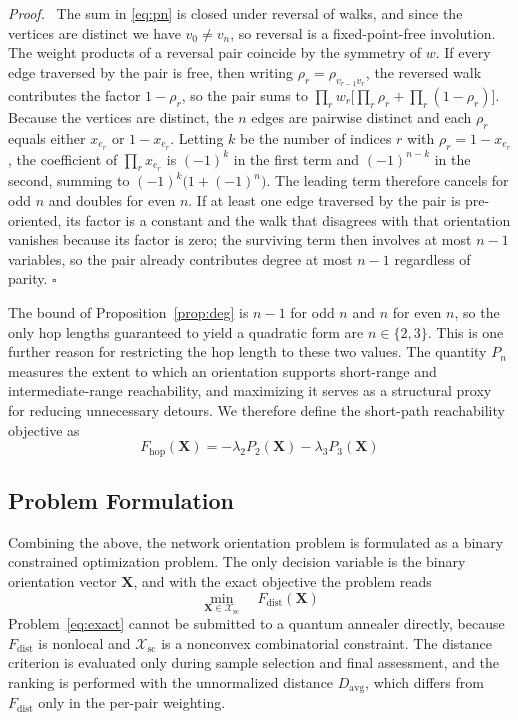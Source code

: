 \documentclass[twocolumn,a4paper]{article}
\newenvironment{proof}{\par\noindent\textit{Proof.}\ }{\hfill\(\square\)\par\medskip}
\begin{document}
\begin{proof}
The sum in \eqref{eq:pn} is closed under reversal of walks, and since the vertices are distinct we have \(v_0\neq v_n\), so reversal is a fixed-point-free involution. The weight products of a reversal pair coincide by the symmetry of \(w\). If every edge traversed by the pair is free, then writing \(\rho_r=\rho_{v_{r-1}v_r}\), the reversed walk contributes the factor \(1-\rho_r\), so the pair sums to \(\prod_rw_r\bigl[\prod_r\rho_r+\prod_r(1-\rho_r)\bigr]\). Because the vertices are distinct, the \(n\) edges are pairwise distinct and each \(\rho_r\) equals either \(x_{e_r}\) or \(1-x_{e_r}\). Letting \(k\) be the number of indices \(r\) with \(\rho_r=1-x_{e_r}\), the coefficient of \(\prod_rx_{e_r}\) is \((-1)^k\) in the first term and \((-1)^{n-k}\) in the second, summing to \((-1)^k\bigl(1+(-1)^n\bigr)\). The leading term therefore cancels for odd \(n\) and doubles for even \(n\). If at least one edge traversed by the pair is pre-oriented, its factor is a constant and the walk that disagrees with that orientation vanishes because its factor is zero; the surviving term then involves at most \(n-1\) variables, so the pair already contributes degree at most \(n-1\) regardless of parity.
\end{proof}

The bound of Proposition~\ref{prop:deg} is \(n-1\) for odd \(n\) and \(n\) for even \(n\), so the only hop lengths guaranteed to yield a quadratic form are \(n\in\{2,3\}\). This is one further reason for restricting the hop length to these two values. The quantity \(P_n\) measures the extent to which an orientation supports short-range and intermediate-range reachability, and maximizing it serves as a structural proxy for reducing unnecessary detours. We therefore define the short-path reachability objective as
\begin{equation}
F_{\mathrm{hop}}(\mathbf{X})=-\lambda_2P_2(\mathbf{X})-\lambda_3P_3(\mathbf{X})
\end{equation}

\subsection{Problem Formulation}

Combining the above, the network orientation problem is formulated as a binary constrained optimization problem. The only decision variable is the binary orientation vector \(\mathbf{X}\), and with the exact objective the problem reads
\begin{equation}
\min_{\mathbf{X}\in\mathcal{X}_{\mathrm{sc}}}\quad F_{\mathrm{dist}}(\mathbf{X})
\label{eq:exact}
\end{equation}
Problem~\eqref{eq:exact} cannot be submitted to a quantum annealer directly, because \(F_{\mathrm{dist}}\) is nonlocal and \(\mathcal{X}_{\mathrm{sc}}\) is a nonconvex combinatorial constraint. The distance criterion is evaluated only during sample selection and final assessment, and the ranking is performed with the unnormalized distance \(D_{\mathrm{avg}}\), which differs from \(F_{\mathrm{dist}}\) only in the per-pair weighting.
\end{document}

